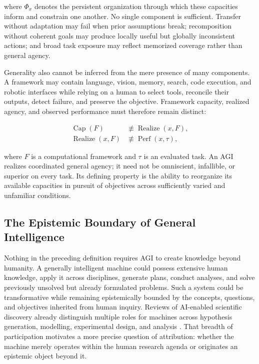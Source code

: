 where $\Phi_x$ denotes the persistent organization through which these
capacities inform and constrain one another. No single component is sufficient.
Transfer without adaptation may fail when prior assumptions break;
recomposition without coherent goals may produce locally useful but globally
inconsistent actions; and broad task exposure may reflect memorized coverage
rather than general agency.

Generality also cannot be inferred from the mere presence of many components.
A framework may contain language, vision, memory, search, code execution, and
robotic interfaces while relying on a human to select tools, reconcile their
outputs, detect failure, and preserve the objective. Framework capacity,
realized agency, and observed performance must therefore remain distinct:

\begin{equation}
\begin{aligned}
\operatorname{Cap}(F)
&\not\equiv \operatorname{Realize}(x,F),\\
\operatorname{Realize}(x,F)
&\not\equiv \operatorname{Perf}(x,\tau),
\end{aligned}
\label{eq:capacity_realization}
\end{equation}

where $F$ is a computational framework and $\tau$ is an evaluated task. An AGI
realizes coordinated general agency; it need not be omniscient, infallible, or
superior on every task. Its defining property is the ability to reorganize its
available capacities in pursuit of objectives across sufficiently varied and
unfamiliar conditions.

\subsection{\textbf{The Epistemic Boundary of General Intelligence}}

Nothing in the preceding definition requires AGI to create knowledge beyond
humanity. A generally intelligent machine could possess extensive human
knowledge, apply it across disciplines, generate plans, conduct analyses, and
solve previously unsolved but already formulated problems. Such a system could
be transformative while remaining epistemically bounded by the concepts,
questions, and objectives inherited from human inquiry.
Reviews of AI-enabled scientific discovery already distinguish multiple roles
for machines across hypothesis generation, modelling, experimental design, and
analysis \cite{wang2023scientific}. That breadth of participation motivates a
more precise question of attribution: whether the machine merely operates
within the human research agenda or originates an epistemic object beyond it.

